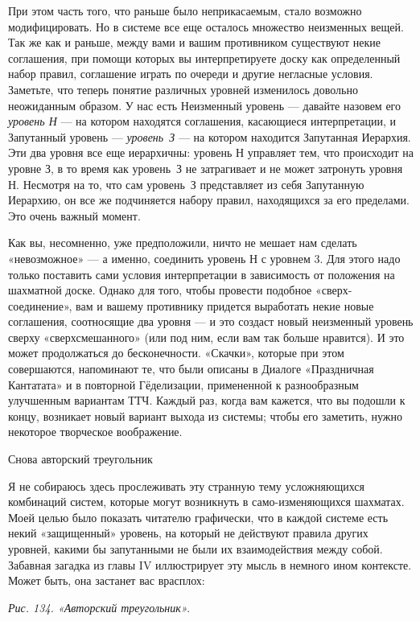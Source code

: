 При этом часть того, что раньше было неприкасаемым, стало возможно модифицировать. Но в системе все еще осталось множество неизменных вещей. Так же как и раньше, между вами и вашим противником существуют некие соглашения, при помощи которых вы интерпретируете доску как определенный набор правил, соглашение играть по очереди и другие негласные условия. Заметьте, что теперь понятие различных уровней изменилось довольно неожиданным образом. У нас есть Неизменный уровень --- давайте назовем его \emph{уровень Н} --- на котором находятся соглашения, касающиеся интерпретации, и Запутанный уровень --- \emph{уровень~З} --- на котором находится Запутанная Иерархия. Эти два уровня все еще иерархичны: уровень Н управляет тем, что происходит на уровне З, в то время как уровень~З не затрагивает и не может затронуть уровня Н. Несмотря на то, что сам уровень~З представляет из себя Запутанную Иерархию, он все же подчиняется набору правил, находящихся за его пределами. Это очень важный момент.

Как вы, несомненно, уже предположили, ничто не мешает нам сделать «невозможное» --- а именно, соединить уровень Н с уровнем 3. Для этого надо только поставить сами условия интерпретации в зависимость от положения на шахматной доске. Однако для того, чтобы провести подобное «сверх-соединение», вам и вашему противнику придется выработать некие новые соглашения, соотносящие два уровня --- и это создаст новый неизменный уровень сверху «сверхсмешанного» (или под ним, если вам так больше нравится). И это может продолжаться до бесконечности. «Скачки», которые при этом совершаются, напоминают те, что были описаны в Диалоге «Праздничная Кантатата» и в повторной Гёделизации, примененной к разнообразным улучшенным вариантам ТТЧ. Каждый раз, когда вам кажется, что вы подошли к концу, возникает новый вариант выхода из системы; чтобы его заметить, нужно некоторое творческое воображение.

Снова авторский треугольник

Я не собираюсь здесь прослеживать эту странную тему усложняющихся комбинаций систем, которые могут возникнуть в само-изменяющихся шахматах. Моей целью было показать читателю графически, что в каждой системе есть некий «защищенный» уровень, на который не действуют правила других уровней, какими бы запутанными не были их взаимодействия между собой. Забавная загадка из главы IV иллюстрирует эту мысль в немного ином контексте. Может быть, она застанет вас врасплох:

\emph{Рис. 134. «Авторский треугольник».}

